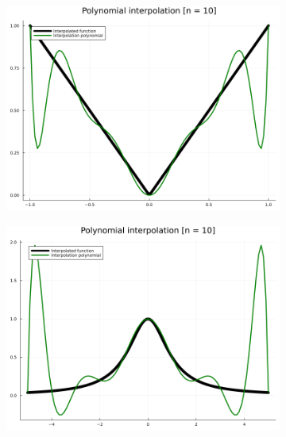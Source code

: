 \documentclass[11pt]{article}
\begin{document}
        \begin{figure}[htbp]
            \begin{subfigure}[b]{0.45\textwidth}
                \includegraphics[width=\linewidth]{img/ex6_f1_n10.png}
            \end{subfigure}
            \hfill
            \begin{subfigure}[b]{0.45\textwidth}
                \includegraphics[width=\linewidth]{img/ex6_f2_n10.png}
            \end{subfigure}
            \begin{subfigure}[b]{0.45\textwidth}

\end{subfigure}
\end{figure}
\end{document}
